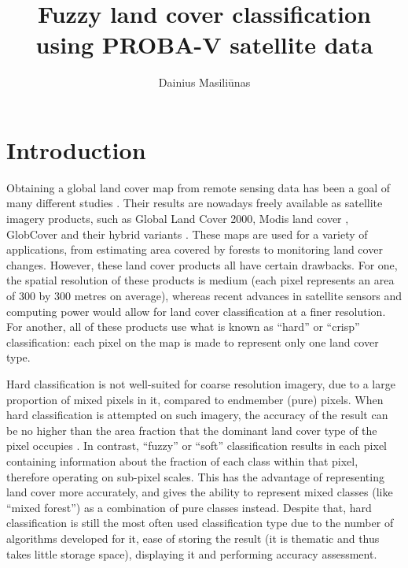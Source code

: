 \documentclass[a4paper,10pt]{article}
\title{Fuzzy land cover classification using PROBA-V satellite data}
\author{Dainius Masili\=unas}
\begin{document}
\maketitle

\section{Introduction}

Obtaining a global land cover map from remote sensing data has been a goal of many different studies \cite{hansen2000hardtree}. Their results are nowadays freely available as satellite imagery products, such as Global Land Cover 2000, Modis land cover \cite{giri2005glc2000modis}, GlobCover \cite{arino2007globcover} and their hybrid variants \cite{see2015hybrid}. These maps are used for a variety of applications, from estimating area covered by forests \cite{bartalev2014probavboreal} to monitoring land cover changes. However, these land cover products all have certain drawbacks. For one, the spatial resolution of these products is medium (each pixel represents an area of 300 by 300 metres on average), whereas recent advances in satellite sensors and computing power would allow for land cover classification at a finer resolution. For another, all of these products use what is known as ``hard'' or ``crisp'' classification: each pixel on the map is made to represent only one land cover type.

Hard classification is not well-suited for coarse resolution imagery, due to a large proportion of mixed pixels in it, compared to endmember (pure) pixels. When hard classification is attempted on such imagery, the accuracy of the result can be no higher than the area fraction that the dominant land cover type of the pixel occupies \cite{latifovic2004accuracy}. In contrast, ``fuzzy'' or ``soft'' classification results in each pixel containing information about the fraction of each class within that pixel, therefore operating on sub-pixel scales. This has the advantage of representing land cover more accurately, and gives the ability to represent mixed classes (like ``mixed forest'') as a combination of pure classes instead. Despite that, hard classification is still the most often used classification type due to the number of algorithms developed for it, ease of storing the result (it is thematic and thus takes little storage space), displaying it and performing accuracy assessment.
\end{document}
